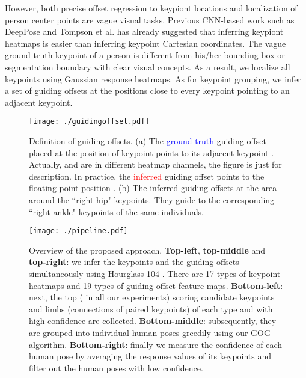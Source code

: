 \documentclass{article}
\begin{document}
However, both precise offset regression to keypiont locations and localization of person center points are vague visual tasks. Previous CNN-based work such as DeepPose \cite{Toshev2013DeepPose} and Tompson et al.  \cite{Tompson2014Joint} has already suggested that inferring keypiont heatmaps is easier than inferring keypoint Cartesian coordinates. The vague ground-truth keypoint of a person is different from his/her bounding box or segmentation boundary with clear visual concepts. As a result, we localize all keypoints using Gaussian response heatmaps. As for keypoint grouping, we infer a set of guiding offsets at the positions close to every keypoint pointing to an adjacent keypoint.


\begin{figure}[!tb]
\centering
	\texttt{[image: ./guidingoffset.pdf]}
	\vspace{-4mm}
	\caption{Definition of guiding offsets. (a) The \textcolor{blue}{ground-truth} guiding offset placed at the position of keypoint  points to its adjacent keypoint . Actually,  and  are in different heatmap channels, the figure is just for description. In practice, the \textcolor{red}{inferred} guiding offset points to the floating-point position . (b) The inferred guiding offsets at the area around the ``right hip" keypoints. They guide to the corresponding ``right ankle" keypoints of the same individuals.}
	\label{fig:guidingoff}
	\vspace{-4mm}
\end{figure}


\begin{figure*}[!htb]
\centering
	\texttt{[image: ./pipeline.pdf]}
	\vspace{-4mm}
	\caption{Overview of the proposed approach. \textbf{Top-left}, \textbf{top-middle} and \textbf{top-right}: we infer the keypoints and the guiding offsets simultaneously using Hourglass-104 \cite{Newell2016Stacked, law2018cornernet, Zhou:2019ta}. There are 17 types of keypoint heatmaps and 19 types of guiding-offset feature maps. \textbf{Bottom-left}: next, the top  ( in all our experiments) scoring candidate keypoints and limbs (connections of paired keypoints) of each type and with high confidence are collected. \textbf{Bottom-middle}: subsequently, they are grouped into individual human poses greedily using our GOG algorithm. \textbf{Bottom-right}: finally we measure the confidence of each human pose by averaging the response values of its keypoints and filter out the human poses with low confidence.}
	\label{fig:pipeline}
	\vspace{-4mm}
\end{figure*}
\end{document}
